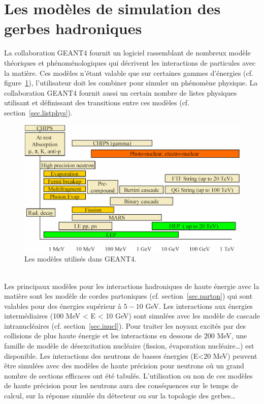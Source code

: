 \section{Les modèles de simulation des gerbes hadroniques}
La collaboration GEANT4 \cite{geant4} fournit un logiciel rassemblant de nombreux modèle théoriques et phénoménologiques qui décrivent les interactions de particules avec la matière. Ces modèles n'étant valable que sur certaines gammes d'énergies (cf. figure~\ref{fig.model}), l'utilisateur doit les combiner pour simuler un phénomène physique. La collaboration GEANT4 fournit aussi un certain nombre de listes physiques utilisant et définissant des transitions entre ces modèles (cf. section~\ref{sec.listphys}).
\begin{figure}[!ht]
  \begin{center}
    \includegraphics[width=.8\textwidth]{Digitizer/figs/HadronicModelsInventory.jpg}
    \caption{Les modèles utilisés dans GEANT4.}
    \label{fig.model}
  \end{center}
\end{figure}
\\
Les principaux modèles pour les interactions hadroniques de haute énergie avec la matière sont les modèle de cordes partoniques (cf. section~\ref{sec.parton}) qui sont valables pour des énergies supérieur à $5-10$ GeV. Les interactions aux énergies intermédiaires (100 MeV < E < 10 GeV) sont simulées avec les modèle de cascade intranucléaires (cf. section~\ref{sec.inucl}). Pour traiter les noyaux excités par des collisions de plus haute énergie et les interactions en dessous de 200 MeV, une famille de modèle de désexcitation nucléaire (fission, évaporation nucléaire\dots) est disponible. Les interactions des neutrons de basses énergies (E<20 MeV) peuvent être simulées avec des modèles de haute précision pour neutrons où un grand nombre de sections efficaces ont été tabulés. L'utilisation ou non de ces modèles de haute précision pour les neutrons aura des conséquences sur le temps de calcul, sur la réponse simulée du détecteur ou sur la topologie des gerbes\dots
